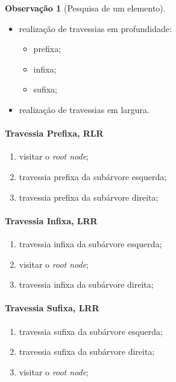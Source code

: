 \documentclass[a4paper, 12pt]{article}
\newtheorem{remark}{Observação}
\begin{document}
\begin{remark}[Pesquisa de um elemento]\end{remark}
\begin{itemize}
    \item realização de travessias em profundidade:
    \begin{itemize}
        \item prefixa;
        \item infixa;
        \item sufixa;
    \end{itemize}
    \item realização de travessias em largura.
\end{itemize}

\paragraph{Travessia Prefixa, \textbf{RLR}}
\begin{enumerate}
    \item visitar o \emph{root node};
    \item travessia prefixa da subárvore esquerda;
    \item travessia prefixa da subárvore direita;
\end{enumerate}

\paragraph{Travessia Infixa, \textbf{LRR}}
\begin{enumerate}
    \item travessia infixa da subárvore esquerda;
    \item visitar o \emph{root node};
    \item travessia infixa da subárvore direita;
\end{enumerate}

\paragraph{Travessia Sufixa, \textbf{LRR}}
\begin{enumerate}
    \item travessia sufixa da subárvore esquerda;
    \item travessia sufixa da subárvore direita;
    \item visitar o \emph{root node};
\end{enumerate}
\end{document}
